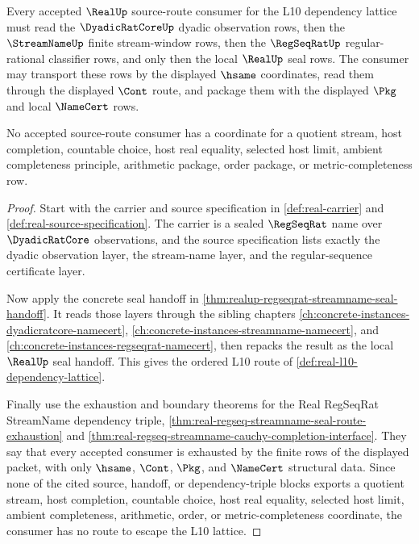 \begin{theorem}
\label{thm:real-l10-source-route-nonescape}
Every accepted $\RealUp$ source-route consumer for the L10 dependency lattice
must read the $\DyadicRatCoreUp$ dyadic observation rows, then the
$\StreamNameUp$ finite stream-window rows, then the $\RegSeqRatUp$
regular-rational classifier rows, and only then the local $\RealUp$ seal rows.
The consumer may transport these rows by the displayed $\hsame$ coordinates,
read them through the displayed $\Cont$ route, and package them with the
displayed $\Pkg$ and local $\NameCert$ rows.

No accepted source-route consumer has a coordinate for a quotient stream, host
completion, countable choice, host real equality, selected host limit,
ambient completeness principle, arithmetic package, order package, or
metric-completeness row.
\end{theorem}
\begin{proof}
Start with the carrier and source specification in
\autoref{def:real-carrier} and \autoref{def:real-source-specification}. The
carrier is a sealed $\RegSeqRat$ name over $\DyadicRatCore$ observations, and
the source specification lists exactly the dyadic observation layer, the
stream-name layer, and the regular-sequence certificate layer.

Now apply the concrete seal handoff in
\autoref{thm:realup-regseqrat-streamname-seal-handoff}. It reads those layers
through the sibling chapters
\autoref{ch:concrete-instances-dyadicratcore-namecert},
\autoref{ch:concrete-instances-streamname-namecert}, and
\autoref{ch:concrete-instances-regseqrat-namecert}, then repacks the result as
the local $\RealUp$ seal handoff. This gives the ordered L10 route of
\autoref{def:real-l10-dependency-lattice}.

Finally use the exhaustion and boundary theorems for the Real RegSeqRat
StreamName dependency triple,
\autoref{thm:real-regseq-streamname-seal-route-exhaustion} and
\autoref{thm:real-regseq-streamname-cauchy-completion-interface}. They say
that every accepted consumer is exhausted by the finite rows of the displayed
packet, with only $\hsame$, $\Cont$, $\Pkg$, and $\NameCert$ structural data.
Since none of the cited source, handoff, or dependency-triple blocks exports a
quotient stream, host completion, countable choice, host real equality,
selected host limit, ambient completeness, arithmetic, order, or
metric-completeness coordinate, the consumer has no route to escape the L10
lattice.
\end{proof}

